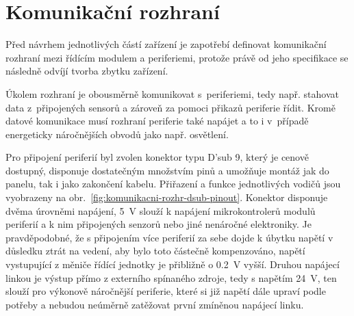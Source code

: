 \section{Komunikační rozhraní}
\label{sec:komunikacni-rozhrani}
    Před návrhem jednotlivých částí zařízení je zapotřebí definovat komunikační rozhraní mezi řídícím modulem a periferiemi, protože právě od jeho specifikace se následně odvíjí tvorba zbytku zařízení. 

    Úkolem rozhraní je obousměrně komunikovat s~periferiemi, tedy např. stahovat data z~připojených sensorů a zároveň za pomoci přikazů periferie řídit. Kromě datové komunikace musí rozhraní periferie také napájet a to i v~případě energeticky náročnějších obvodů jako např. osvětlení. 

    Pro připojení periferií byl zvolen konektor typu D'sub 9, který je cenově dostupný, disponuje dostatečným množstvím pinů a umožňuje montáž jak do panelu, tak i jako zakončení kabelu. Přiřazení a funkce jednotlivých vodičů jsou vyobrazeny na obr.~\ref{fig:komunikacni-rozhr-dsub-pinout}. Konektor disponuje dvěma úrovněmi napájení, \qty{5}{V} slouží k napájení mikrokontrolerů modulů periferií a k nim připojených senzorů nebo jiné nenáročné elektroniky. Je pravděpodobné, že s připojením více periferií za sebe dojde k úbytku napětí v důsledku ztrát na vedení, aby bylo toto částečně kompenzováno, napětí vystupující z měniče řídící jednotky je přibližně o \qty{0.2}{V} vyšší. Druhou napájecí linkou je výstup přímo z externího spínaného zdroje, tedy s napětím \qty{24}{V}, ten slouží pro výkonově náročnější periferie, které si již napětí dále upraví podle potřeby a nebudou neúměrně zatěžovat první zmíněnou napájecí linku.

